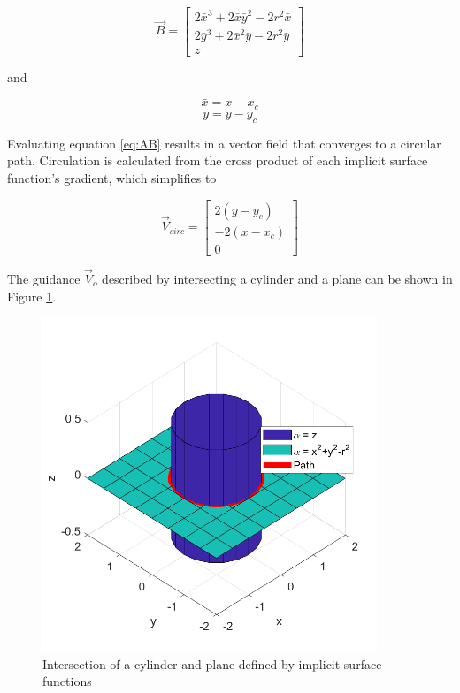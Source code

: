 \documentclass[numbered,pdftex]{ohio-etd}
\begin{document}
\begin{equation}
\overrightarrow{B} = \begin{bmatrix} 2\bar{x}^3+2\bar{x}\bar{y}^2-2r^2\bar{x} \\ 2\bar{y}^3+2\bar{x}^2\bar{y}-2r^2\bar{y} \\z \end{bmatrix}
\end{equation}

\noindent
and


\begin{equation}
\bar{x} = x - x_c
\end{equation}
\begin{equation}
\bar{y} = y - y_c
\end{equation}


Evaluating equation \ref{eq:AB} results in a vector field that converges to a circular path. Circulation is calculated from the cross product of each implicit surface function's gradient, which simplifies to



\begin{equation}
\label{eq:vcirc_circle}
\overrightarrow{V}_{circ} =  \begin{bmatrix}  2(y-y_c) \\[6pt] -2(x-x_c) \\[6pt] 0\end{bmatrix}
\end{equation}

The guidance $\overrightarrow{V}_o$ described by intersecting a cylinder and a plane can be shown in Figure \ref{fig:cylinderIntersection}. 

\begin{figure}[H]
	\centering
	\includegraphics[width=10cm]{Figures/cylinderIntersection}
	\caption{Intersection of a cylinder and plane defined by implicit surface functions}
	\label{fig:cylinderIntersection}
\end{figure}
\end{document}
